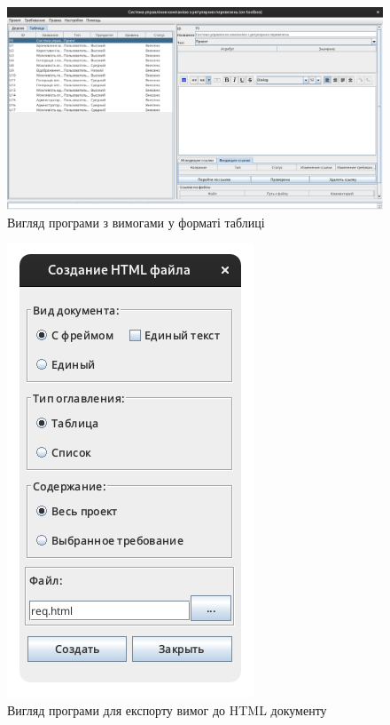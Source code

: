 \documentclass[14pt]{extreport}
\begin{document}
\begin{normalsize}
\begin{figure}[H]
	\centering
	\includegraphics[scale=0.35]{3}
	\caption{Вигляд програми з вимогами у форматі таблиці}
\end{figure}



\begin{figure}[H]
	\centering
	\includegraphics[scale=0.35]{4}
	\caption{Вигляд програми для експорту вимог до HTML документу}
\end{figure}



\end{normalsize}
\end{document}
